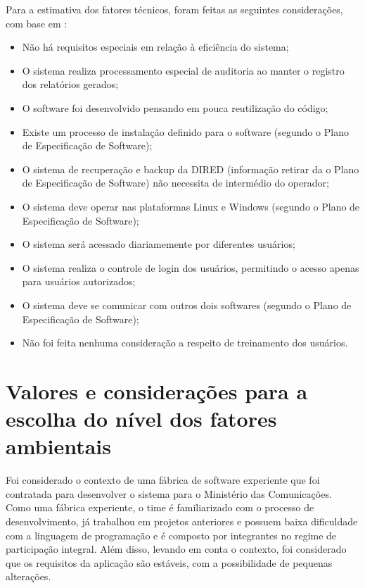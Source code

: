       Para a estimativa dos fatores técnicos, foram feitas as seguintes considerações, com base em \cite{artigo_pcu}:   
      \begin{itemize}
       \item Não há requisitos especiais em relação à eficiência do sistema;
       \item O sistema realiza processamento especial de auditoria ao manter o registro dos relatórios gerados;
       \item O software foi desenvolvido pensando em pouca reutilização do código;
       \item Existe um processo de instalação definido para o software (segundo o Plano de Especificação de Software);
       \item O sistema de recuperação e backup da DIRED (informação retirar da o Plano de Especificação de Software)
	  não necessita de intermédio do operador;
       \item O sistema deve operar nas plataformas Linux e Windows (segundo o Plano de Especificação de Software);
       \item O sistema será acessado diariamemente por diferentes usuários;
       \item O sistema realiza o controle de login dos usuários, permitindo o acesso apenas para usuários autorizados;
       \item O sistema deve se comunicar com outros dois softwares (segundo o Plano de Especificação de Software);
       \item Não foi feita nenhuma consideração a respeito de treinamento dos usuários.
      \end{itemize}

  
\section{Valores e considerações para a escolha do nível dos fatores ambientais}
    
    Foi considerado o contexto de uma fábrica de software experiente que foi contratada para desenvolver o sistema 
    para o Ministério das Comunicações. Como uma fábrica experiente, o time é familiarizado com o processo de desenvolvimento, 
    já trabalhou em projetos anteriores e possuem baixa dificuldade com a linguagem de programação e é composto por integrantes no regime de 
    participação integral.
    Além disso, levando em conta o contexto,
    foi considerado que os requisitos da aplicação são estáveis, com a possibilidade de pequenas alterações.
    
